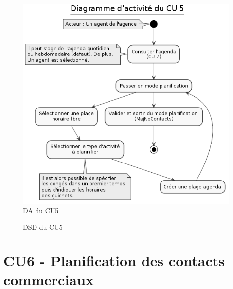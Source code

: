 \begin{figure}[H]
\centering
\includegraphics[width=\textwidth]{figures/DA_CU5.png}
\caption{DA du CU5}
\end{figure}

\begin{figure}[H]
\centering
\caption{DSD du CU5}
\end{figure}

\clearpage
\section{CU6 - Planification des contacts commerciaux}

